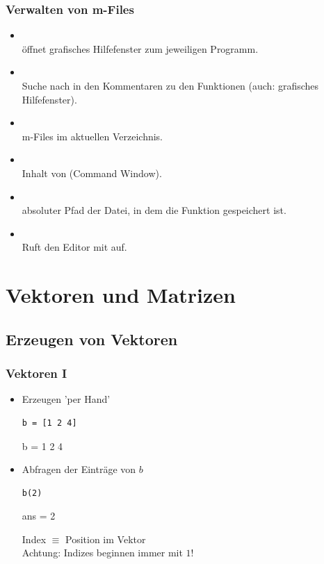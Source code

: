 \documentclass[hyperref={xetex}]{beamer}
\begin{document}
\begin{frame}[fragile]\frametitle{Verwalten von m-Files}
\begin{itemize}
\item \alert{ }\\ öffnet grafisches Hilfefenster zum jeweiligen Programm.
\item \alert{ } \\ Suche nach  in den
  Kommentaren zu den Funktionen (auch: grafisches Hilfefenster).
\item  \alert{ }\\ m-Files im aktuellen Verzeichnis.
\item  \alert{ }\\ Inhalt von  (Command Window).
\item  \alert{ }\\ absoluter Pfad der Datei, in dem die  Funktion
   gespeichert ist. 
\item \alert{ }\\ Ruft den Editor mit  auf.
\end{itemize}
\end{frame}








\section{Vektoren und Matrizen}



\subsection{Erzeugen von Vektoren}
%
%
\begin{frame}[fragile]\frametitle{Vektoren I}
\begin{itemize}
\item Erzeugen 'per Hand'
\begin{lstlisting}
b = [1 2 4]
\end{lstlisting}
\begin{matlab}
b =
     1     2     4 
\end{matlab}

\item Abfragen der Einträge von $b$
\begin{lstlisting}
b(2)
\end{lstlisting}
\begin{matlab}
ans =      2 
\end{matlab}

Index $\equiv$ Position im Vektor\\

\alert{Achtung}: Indizes beginnen immer mit $1$!

\end{itemize}
\end{frame}
\end{document}
